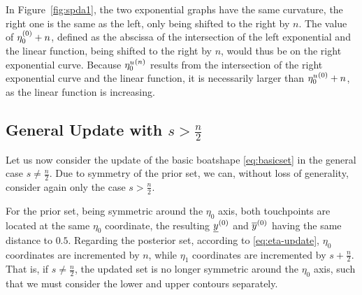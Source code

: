 In Figure~\ref{fig:spda1}, the two exponential graphs have the same curvature,
the right one is the same as the left, only being shifted to the right by $n$.
The value of $\eta_0^{(0)} + n$, defined as the abscissa of the intersection of the left exponential and the linear function,
being shifted to the right by $n$, would thus be on the right exponential curve.
Because ${\eta_0^u}^{(n)}$ results from the intersection of the right exponential curve and the linear function,
it is necessarily larger than ${\eta_0^u}^{(0)} + n$, as the linear function is increasing.


\subsection{General Update with \texorpdfstring{$s > \frac{n}{2}$}{s > n/2}}
\label{sec:generalupdate}

Let us now consider the update of the basic boatshape \eqref{eq:basicset} %
in the general case $s \neq \frac{n}{2}$.
Due to symmetry of the prior set, we can, without loss of generality,
consider again only the case $s > \frac{n}{2}$.

For the prior set, being symmetric around the $\eta_0$ axis,
both touchpoints are located at the same $\eta_0$ coordinate,
the resulting $\underline{y}^{(0)}$ and $\overline{y}^{(0)}$ having the same distance to $0.5$.
Regarding the posterior set, according to \eqref{eq:eta-update},
$\eta_0$ coordinates are incremented by $n$, while
$\eta_1$ coordinates are incremented by $s+\frac{n}{2}$.
That is, if $s \neq \frac{n}{2}$, the updated set is no longer symmetric around the $\eta_0$ axis,
such that we must consider the lower and upper contours separately.

